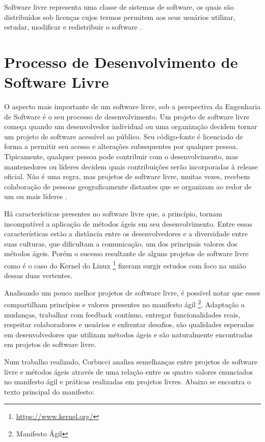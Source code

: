Software livre representa uma classe de sistemas de software, os quais são distribuídos sob licenças cujos termos permitem aos seus usuários utilizar, estudar, modificar e redistribuir o software \cite{terceiro2012freesoftware}. 

\section{Processo de Desenvolvimento de Software Livre}

O aspecto mais importante de um software livre, sob a perspectiva da Engenharia de Software é o seu processo de desenvolvimento. Um projeto de software livre começa quando um desenvolvedor individual ou uma organização decidem tornar um projeto de software acessível ao público. Seu código-fonte é licenciado de forma a permitir seu acesso e alterações subsequentes por qualquer pessoa. Tipicamente, qualquer pessoa pode contribuir com o desenvolvimento, mas mantenedores ou líderes decidem quais contribuições serão incorporadas à release oficial. Não é uma regra, mas projetos de software livre, muitas vezes, recebem colaboração de pessoas geograficamente distantes que se organizam ao redor de um ou mais líderes \cite{corbucci2011freemethods}. 

Há características presentes no software livre que, a princípio, tornam incompatível a aplicação de métodos ágeis em seu desenvolvimento. Entre essas características estão a distância entre os desenvolvedores e a diversidade entre suas culturas, que dificultam a comunicação, um dos principais valores dos métodos ágeis. Porém o sucesso resultante de alguns projetos de software livre como é o caso do Kernel do Linux \footnote{\url{https://www.kernel.org/}} fizeram surgir estudos com foco na união dessas duas vertentes.

Analisando um pouco melhor projetos de software livre, é possível notar que esses compartilham princípios e valores presentes no manifesto ágil \footnote{Manifesto Ágil}. Adaptação a mudanças, trabalhar com feedback contínuo, entregar funcionalidades reais, respeitar colaboradores e usuários e enfrentar desafios, são qualidades esperadas em desenvolvedores que utilizam métodos ágeis e são naturalmente encontradas em projetos de software livre.

Num trabalho realizado, Corbucci \cite{corbucci2011freemethods} analisa semelhanças entre projetos de software livre e métodos ágeis através de uma relação entre os quatro valores enunciados no manifesto ágil e práticas realizadas em projetos livres. Abaixo se encontra o texto principal do manifesto:

